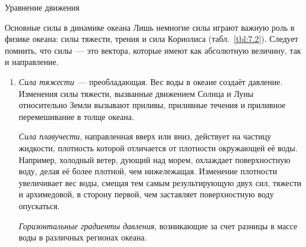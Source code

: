 \begin{chapter}{Уравнение движения}
\begin{section}{Основные силы в динамике океана}
Лишь немногие силы играют важную роль в физике океана: силы тяжести, трения
и сила Кориолиса (табл.~\ref{tbl:7.2}). Следует помнить, что силы~--- это 
вектора, которые имеют как абсолютную величину, так и направление.
%
%
\begin{enumerate}
\item
\emph{Сила тяжести}~--- преобладающая. Вес воды в океане создаёт давление.
Изменения силы тяжести, вызванные движением Солнца и Луны относительно Земли 
вызывают приливы, приливные течения и приливное перемешивание в толще океана.
%

\emph{Сила плавучести}, направленная вверх или вниз, действует 
на частицу жидкости, плотность которой отличается от плотности окружающей 
её воды. Например, холодный ветер, дующий над
морем, охлаждает поверхностную воду, делая её более плотной, чем 
нижележащая. Изменение плотности увеличивает вес воды, смещая тем самым
результирующую двух сил, тяжести и архимедовой, в сторону первой,
чем заставляет поверхностную воду опускаться.
%

\emph{Горизонтальные градиенты давления}, возникающие за счет разницы в
массе воды в различных регионах океана.
%


\end{enumerate}
\end{section}
\end{chapter}
